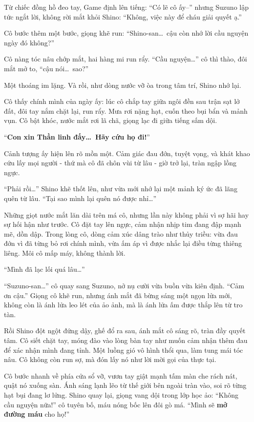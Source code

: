 \documentclass[../main.tex]{subfiles}
\begin{document}
Từ chiếc đồng hồ đeo tay, Game định lên tiếng: ``Có lẽ cô ấy--'' nhưng Suzuno lập tức ngắt lời, không rời mắt khỏi Shino: ``Không, việc này để cháu giải quyết ạ.''

Cô bước thêm một bước, giọng khẽ run: ``Shino-san\dots\ cậu còn nhớ lời cầu nguyện ngày đó không?''

Cô nàng tóc nâu chớp mắt, hai hàng mi run rẩy. ``Cầu nguyện\dots'' cô thì thào, đôi mắt mở to, ``cậu nói\dots\ sao?''

Một thoáng im lặng. Và rồi, như dòng nước vỡ òa trong tâm trí, Shino nhớ lại.

Cô thấy chính mình của ngày ấy: lúc cô chắp tay giữa ngôi đền sau trận sạt lở đất, đôi tay nắm chặt lại, run rẩy. Mưa rơi nặng hạt, cuốn theo bụi bẩn và mảnh vụn. Cô bật khóc, nước mắt rơi lã chã, giọng lạc đi giữa tiếng sấm dội.

``\textbf{Con xin Thần linh đấy\dots\ Hãy cứu họ đi!}''

Cảnh tượng ấy hiện lên rõ mồn một. Cảm giác đau đớn, tuyệt vọng, và khát khao cứu lấy mọi người - thứ mà cô đã chôn vùi từ lâu - giờ trở lại, tràn ngập lồng ngực.

``Phải rồi\dots'' Shino khẽ thốt lên, như vừa mới nhớ lại một mảnh ký ức đã lãng quên từ lâu. ``Tại sao mình lại quên nó được nhỉ\dots''

Những giọt nước mắt lăn dài trên má cô, nhưng lần này không phải vì sợ hãi hay sự hối hận như trước. Cô đặt tay lên ngực, cảm nhận nhịp tim đang đập mạnh mẽ, dồn dập. Trong lòng cô, dòng cảm xúc dâng trào như thủy triều: vừa đau đớn vì đã từng bỏ rơi chính mình, vừa ấm áp vì được nhắc lại điều từng thiêng liêng. Môi cô mấp máy, không thành lời.

``Mình đã lạc lối quá lâu\dots''

``Suzuno-san\dots'' cô quay sang Suzuno, nở nụ cười vừa buồn vừa kiên định. ``Cảm ơn cậu.'' Giọng cô khẽ run, nhưng ánh mắt đã bừng sáng một ngọn lửa mới, không còn là ánh lửa leo lét của ảo ảnh, mà là ánh lửa ấm được thắp lên từ tro tàn.

Rồi Shino đột ngột đứng dậy, ghế đổ ra sau, ánh mắt cô sáng rõ, tràn đầy quyết tâm. Cô siết chặt tay, móng đào vào lòng bàn tay như muốn cảm nhận thêm đau để xác nhận mình đang tỉnh. Một luồng gió vô hình thổi qua, làm tung mái tóc nâu. Cô không còn run sợ, mà đón lấy nó như lời mời gọi của thực tại.


Cô bước nhanh về phía cửa sổ vỡ, vươn tay giật mạnh tấm màn che rách nát, quật nó xuống sàn. Ánh sáng lạnh lẽo từ thế giới bên ngoài tràn vào, soi rõ từng hạt bụi đang lơ lửng. Shino quay lại, giọng vang dội trong lớp học ảo: ``Không cầu nguyện nữa!'' cô tuyên bố, máu nóng bốc lên đôi gò má. ``Mình sẽ \textbf{mở đường máu} cho họ!''
\end{document}
